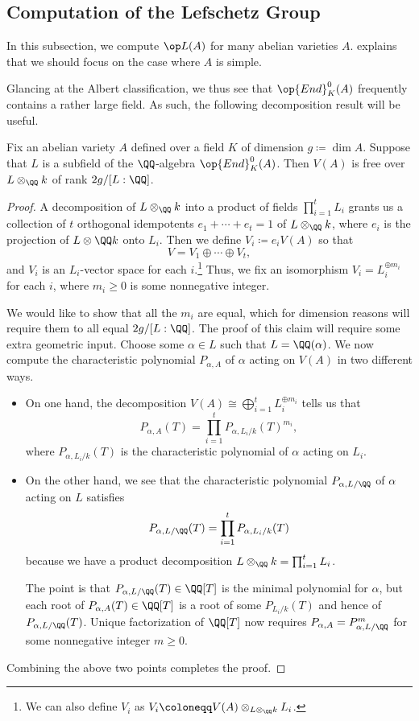 \documentclass{article}
\begin{document}
\subsection{Computation of the Lefschetz Group}
In this subsection, we compute $\op L(A)$ for many abelian varieties $A$.  explains that we should focus on the case where $A$ is simple.

Glancing at the Albert classification, we thus see that $\op{End}_K^0(A)$ frequently contains a rather large field. As such, the following decomposition result will be useful.
\begin{lemma} \label{lem:field-action-on-tate-module}
	Fix an abelian variety $A$ defined over a field $K$ of dimension $g\coloneqq\dim A$. Suppose that $L$ is a subfield of the $\QQ$-algebra $\op{End}^0_K(A)$. Then $V(A)$ is free over $L\otimes_\QQ k$ of rank $2g/[L:\QQ]$.
\end{lemma}
\begin{proof}
	A decomposition of $L\otimes_\QQ k$ into a product of fields $\prod_{i=1}^tL_i$ grants us a collection of $t$ orthogonal idempotents $e_1+\cdots+e_t=1$ of $L\otimes_\QQ k$, where $e_i$ is the projection of $L\otimes\QQ k$ onto $L_i$. Then we define $V_i\coloneqq e_iV(A)$ so that
	\[V=V_1\oplus\cdots\oplus V_t,\]
	and $V_i$ is an $L_i$-vector space for each $i$.\footnote{We can also define $V_i$ as $V_i\coloneqq V(A)\otimes_{L\otimes_\QQ k}L_i$.} Thus, we fix an isomorphism $V_i=L_i^{\oplus m_i}$ for each $i$, where $m_i\ge0$ is some nonnegative integer.

	We would like to show that all the $m_i$ are equal, which for dimension reasons will require them to all equal $2g/[L:\QQ]$. The proof of this claim will require some extra geometric input. Choose some $\alpha\in L$ such that $L=\QQ(\alpha)$. We now compute the characteristic polynomial $P_{\alpha,A}$ of $\alpha$ acting on $V(A)$ in two different ways.
	\begin{itemize}
		\item On one hand, the decomposition $V(A)\cong\bigoplus_{i=1}^tL_i^{\oplus m_i}$ tells us that
		\[P_{\alpha,A}(T)=\prod_{i=1}^tP_{\alpha,L_i/k}(T)^{m_i},\]
		where $P_{\alpha,L_i/k}(T)$ is the characteristic polynomial of $\alpha$ acting on $L_i$.
		\item On the other hand, we see that the characteristic polynomial $P_{\alpha,L/\QQ}$ of $\alpha$ acting on $L$ satisfies
		\[P_{\alpha,L/\QQ}(T)=\prod_{i=1}^tP_{\alpha,L_i/k}(T)\]
		because we have a product decomposition $L\otimes_\QQ k=\prod_{i=1}^tL_i$.

		The point is that $P_{\alpha,L/\QQ}(T)\in\QQ[T]$ is the minimal polynomial for $\alpha$, but each root of $P_{\alpha,A}(T)\in\QQ[T]$ is a root of some $P_{L_i/k}(T)$ and hence of $P_{\alpha,L/\QQ}(T)$. Unique factorization of $\QQ[T]$ now requires $P_{\alpha,A}=P_{\alpha,L/\QQ}^m$ for some nonnegative integer $m\ge0$.
	\end{itemize}
	Combining the above two points completes the proof.
\end{proof}
\end{document}
